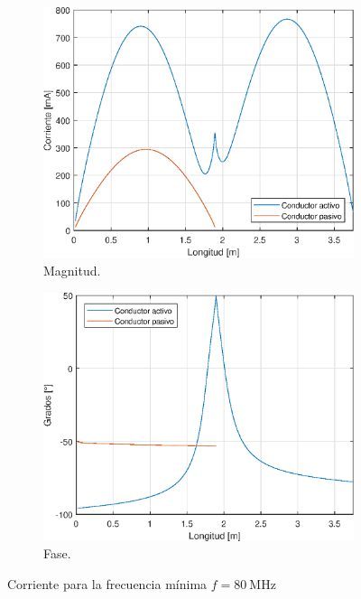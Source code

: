 \begin{figure}[H]
\begin{subfigure}{0.5\textwidth}
		\includegraphics[scale=0.6]{imagenes/i_mag_80.eps}
		\caption{Magnitud.}
	\end{subfigure}
	\quad
	\begin{subfigure}{0.5\textwidth}
		\includegraphics[scale=0.6]{imagenes/i_fase_80.eps}
		\caption{Fase.}
	\end{subfigure}
	\caption{Corriente para la frecuencia mínima $f = \SI{80}{\mega\hertz}$}
\end{figure}


